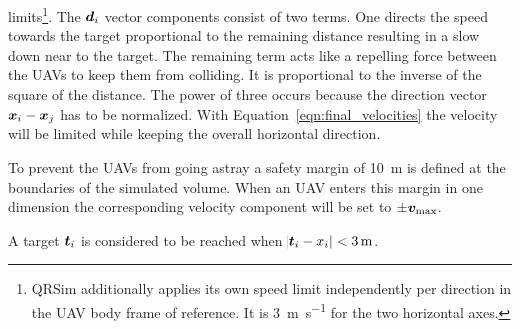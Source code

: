 limits\footnote{QRSim additionally applies its own speed limit independently per 
    direction in the UAV body frame of reference. It is 
    \SI{3}{\meter\per\second} for the two horizontal axes.}.  The $\bm{d}_i$ 
vector components consist of two terms.  One directs the speed towards the 
target proportional to the remaining distance resulting in a slow down near to 
the target. The remaining term acts like a repelling force between the UAVs to 
keep them from colliding.  It is proportional to the inverse of the square of 
the distance. The power of three occurs because the direction vector $\bm{x}_i 
- \bm{x}_j$ has to be normalized.  With Equation~\ref{eqn:final_velocities} the 
velocity will be limited while keeping the overall horizontal direction.

To prevent the UAVs from going astray a safety margin of \SI{10}{\meter} is 
defined at the boundaries of the simulated volume. When an UAV enters this 
margin in one dimension the corresponding velocity component will be set to $\pm 
\bm{v}_{\max}$.

A target $\bm{t}_i$ is considered to be reached when $\abs{\bm{t}_i - x_i} 
< \SI{3}{\meter}$.
